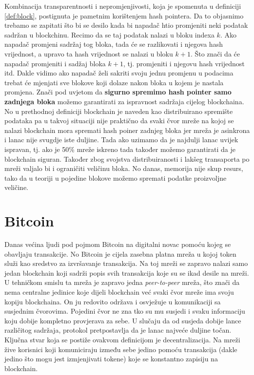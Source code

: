 \documentclass[a4paper,oneside,12pt]{memoir} %
\begin{document}
Kombinacija transparentnosti i nepromjenjivosti, koja je spomenuta u definiciji \ref{def:block}, postignuta je pametnim korištenjem hash pointera. Da to objasnimo trebamo se zapitati što bi se desilo kada bi napadač htio promjeniti neki podatak sadržan u blockchinu. Recimo da se taj podatak nalazi u bloku indexa $k$. Ako napadač promjeni sadržaj tog bloka, tada će se razlikovati i njegova hash vrijednost, a upravo ta hash vrijednost se nalazi u bloku $k+1$. Što znači da će napadač promjeniti i sadžaj bloka $k+1$, tj. promjeniti i njegovu hash vrijednost itd. Dakle vidimo ako napadač želi sakriti svoju jednu promjenu u podacima trebat će mjenjati sve blokove koji dolaze nakon bloka u kojem je nastala promjena. Znači pod uvjetom da \textbf{sigurno spremimo hash pointer samo zadnjega bloka} možemo garantirati za ispravnost sadržaja cijelog blockchaina. No u prethodnoj definiciji blockchain je naveden kao distribuirano spremište podataka pa u takvoj situaciji nije praktično da svaki čvor mreže na kojoj se nalazi blockchain mora spremati hash poiner zadnjeg bloka jer mreža je asinkrona i lanac nije svugdje iste duljine. Tada ako uzimamo da je najdulji lanac uvijek ispravan, tj. ako je 50\% mreže iskreno tada također možemo garantirati da je blockchain siguran. Također zbog svojstva distribuiranosti i lakšeg transaporta po mreži valjalo bi i ograničiti veličinu bloka. No danas, memorija nije skup resurs, tako da u teoriji u pojedine blokove možemo spremati podatke proizvoljne veličine.

\section{Bitcoin}

Danas većina ljudi pod pojmom Bitcoin na digitalni novac pomoću kojeg se obavljaju transakcije. No Bitcoin je cijela zasebna platna mreža u kojoj token služi kao sredstvo za izvršavanje transakcija. Na toj mreži se zapravo nalazi samo jedan blockchain koji sadrži popis svih transakcija koje su se ikad desile na mreži. U tehničkom smislu ta mreža je zapravo jedna \textit{peer-to-peer} mreža, što znači da nema centralne jedinice koje dijeli blockchain već svaki čvor mreže ima svoju kopiju blockchaina. On ju redovito održava i osvježuje u komunikaciji sa susjednim čvorovima. Pojedini čvor ne zna tko su mu susjedi i svaku informaciju koju dobije kompletno provjerava za sebe. U slučaju da od susjeda dobije lance različitog sadržaja, protokol pretpostavlja da je lanac najveće duljine točan. Ključna stvar koja se postiže ovakvom definicijom je decentralizacija. Na mreži žive korisnici koji komuniciraju između sebe jedino pomoću transakcija (dakle jedino što mogu jest izmjenjivati tokene) koje se konstantno zapisiju na blockchain. 
\end{document}
